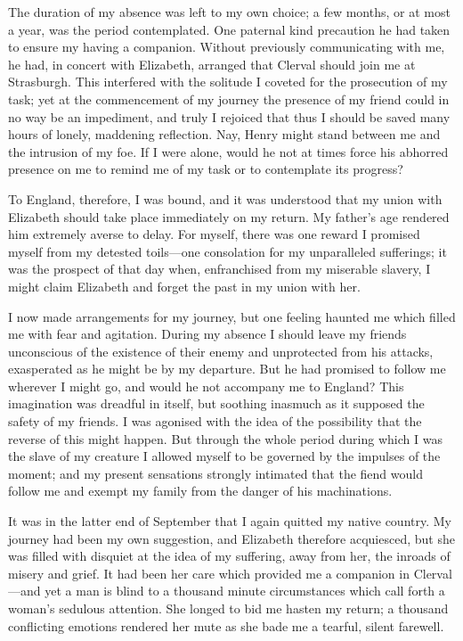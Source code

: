 \documentclass[12pt,openright]{book}
\begin{document}
The duration of my absence was left to my own choice; a few months, or at most a year, was the period contemplated. One paternal kind precaution he had taken to ensure my having a companion. Without previously communicating with me, he had, in concert with Elizabeth, arranged that Clerval should join me at Strasburgh. This interfered with the solitude I coveted for the prosecution of my task; yet at the commencement of my journey the presence of my friend could in no way be an impediment, and truly I rejoiced that thus I should be saved many hours of lonely, maddening reflection. Nay, Henry might stand between me and the intrusion of my foe. If I were alone, would he not at times force his abhorred presence on me to remind me of my task or to contemplate its progress?

To England, therefore, I was bound, and it was understood that my union with Elizabeth should take place immediately on my return. My father’s age rendered him extremely averse to delay. For myself, there was one reward I promised myself from my detested toils—one consolation for my unparalleled sufferings; it was the prospect of that day when, enfranchised from my miserable slavery, I might claim Elizabeth and forget the past in my union with her.

I now made arrangements for my journey, but one feeling haunted me which filled me with fear and agitation. During my absence I should leave my friends unconscious of the existence of their enemy and unprotected from his attacks, exasperated as he might be by my departure. But he had promised to follow me wherever I might go, and would he not accompany me to England? This imagination was dreadful in itself, but soothing inasmuch as it supposed the safety of my friends. I was agonised with the idea of the possibility that the reverse of this might happen. But through the whole period during which I was the slave of my creature I allowed myself to be governed by the impulses of the moment; and my present sensations strongly intimated that the fiend would follow me and exempt my family from the danger of his machinations.

It was in the latter end of September that I again quitted my native country. My journey had been my own suggestion, and Elizabeth therefore acquiesced, but she was filled with disquiet at the idea of my suffering, away from her, the inroads of misery and grief. It had been her care which provided me a companion in Clerval—and yet a man is blind to a thousand minute circumstances which call forth a woman’s sedulous attention. She longed to bid me hasten my return; a thousand conflicting emotions rendered her mute as she bade me a tearful, silent farewell.
\end{document}
